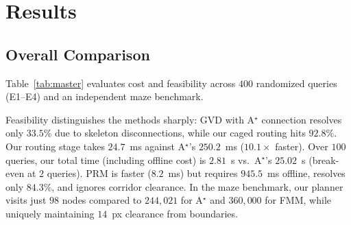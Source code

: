 \documentclass[conference]{IEEEtran}
\begin{document}
\section{Results}
\label{sec:results}

\subsection{Overall Comparison}

Table~\ref{tab:master} evaluates cost and feasibility across $400$ randomized queries (E1--E4) and an independent maze benchmark.

Feasibility distinguishes the methods sharply: GVD with A$^\star$ connection resolves only $33.5\%$ due to skeleton disconnections, while our caged routing hits $92.8\%$. Our routing stage takes $24.7$~ms against A$^\star$'s $250.2$~ms ($10.1\times$ faster). Over $100$ queries, our total time (including offline cost) is $2.81$~s vs.\ A$^\star$'s $25.02$~s (break-even at $2$ queries). PRM is faster ($8.2$~ms) but requires $945.5$~ms offline, resolves only $84.3\%$, and ignores corridor clearance. In the maze benchmark, our planner visits just $98$ nodes compared to $244{,}021$ for A$^\star$ and $360{,}000$ for FMM, while uniquely maintaining $14$~px clearance from boundaries.
\end{document}
